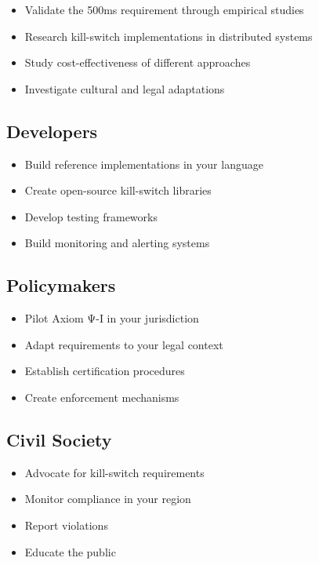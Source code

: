 \begin{itemize}
    \item Validate the 500ms requirement through empirical studies
    \item Research kill-switch implementations in distributed systems
    \item Study cost-effectiveness of different approaches
    \item Investigate cultural and legal adaptations
\end{itemize}

\subsection{Developers}

\begin{itemize}
    \item Build reference implementations in your language
    \item Create open-source kill-switch libraries
    \item Develop testing frameworks
    \item Build monitoring and alerting systems
\end{itemize}

\subsection{Policymakers}

\begin{itemize}
    \item Pilot Axiom Ψ-I in your jurisdiction
    \item Adapt requirements to your legal context
    \item Establish certification procedures
    \item Create enforcement mechanisms
\end{itemize}

\subsection{Civil Society}

\begin{itemize}
    \item Advocate for kill-switch requirements
    \item Monitor compliance in your region
    \item Report violations
    \item Educate the public
\end{itemize}

